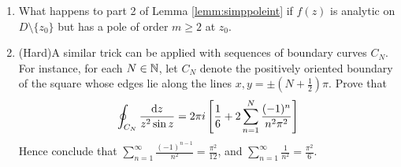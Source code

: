 \begin{exercises}
\begin{enumerate}
	  
	  \item What happens to part 2 of Lemma \ref{lemm:simppoleint} if $f(z)$ is analytic on $D\setminus\{z_0\}$ but has a pole of order $m\ge 2$ at $z_0$.
	  
	  
		\item (Hard)\quad A similar trick can be applied with sequences of boundary curves $C_N$. For instance, for each $N\in\mathbb{N}$, let $C_N$ denote the positively oriented boundary of the square whose edges lie along the lines $x,y=\pm\left(N+\frac 12\right)\pi$. Prove that
	  \[
	  	\oint_{C_N}\frac{{\mathrm{d} z}}{z^2\sin z}=2\pi i\left[\frac 16+2\sum_{n=1}^N\frac{(-1)^n}{n^2\pi^2}\right]
	  \]
	  Hence conclude that $\sum\limits_{n=1}^\infty\frac{(-1)^{n-1}}{n^2}=\frac{\pi^2}{12}$, and $\sum\limits_{n=1}^\infty\frac{1}{n^2}=\frac{\pi^2}{6}$.
	\end{enumerate}
\end{exercises}
